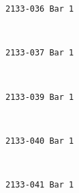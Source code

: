 \documentclass[11pt]{article}
\begin{document}
    \begin{Verbatim}[commandchars=\\\{\}]
2133-036 Bar 1

    \end{Verbatim}

    \begin{center}
    \end{center}
    { \hspace*{\fill} \\}
    
    \begin{Verbatim}[commandchars=\\\{\}]
2133-037 Bar 1

    \end{Verbatim}

    \begin{center}
    \end{center}
    { \hspace*{\fill} \\}
    
    \begin{Verbatim}[commandchars=\\\{\}]
2133-039 Bar 1

    \end{Verbatim}

    \begin{center}
    \end{center}
    { \hspace*{\fill} \\}
    
    \begin{Verbatim}[commandchars=\\\{\}]
2133-040 Bar 1

    \end{Verbatim}

    \begin{center}
    \end{center}
    { \hspace*{\fill} \\}
    
    \begin{Verbatim}[commandchars=\\\{\}]
2133-041 Bar 1

    \end{Verbatim}
\end{document}

